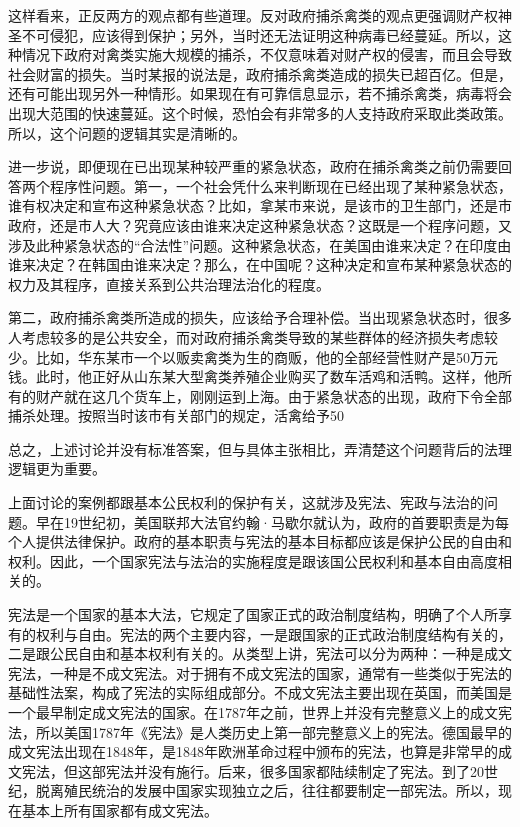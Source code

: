 这样看来，正反两方的观点都有些道理。反对政府捕杀禽类的观点更强调财产权神圣不可侵犯，应该得到保护；另外，当时还无法证明这种病毒已经蔓延。所以，这种情况下政府对禽类实施大规模的捕杀，不仅意味着对财产权的侵害，而且会导致社会财富的损失。当时某报的说法是，政府捕杀禽类造成的损失已超百亿。但是，还有可能出现另外一种情形。如果现在有可靠信息显示，若不捕杀禽类，病毒将会出现大范围的快速蔓延。这个时候，恐怕会有非常多的人支持政府采取此类政策。所以，这个问题的逻辑其实是清晰的。

进一步说，即便现在已出现某种较严重的紧急状态，政府在捕杀禽类之前仍需要回答两个程序性问题。第一，一个社会凭什么来判断现在已经出现了某种紧急状态，谁有权决定和宣布这种紧急状态？比如，拿某市来说，是该市的卫生部门，还是市政府，还是市人大？究竟应该由谁来决定这种紧急状态？这既是一个程序问题，又涉及此种紧急状态的“合法性”问题。这种紧急状态，在美国由谁来决定？在印度由谁来决定？在韩国由谁来决定？那么，在中国呢？这种决定和宣布某种紧急状态的权力及其程序，直接关系到公共治理法治化的程度。

第二，政府捕杀禽类所造成的损失，应该给予合理补偿。当出现紧急状态时，很多人考虑较多的是公共安全，而对政府捕杀禽类导致的某些群体的经济损失考虑较少。比如，华东某市一个以贩卖禽类为生的商贩，他的全部经营性财产是50万元钱。此时，他正好从山东某大型禽类养殖企业购买了数车活鸡和活鸭。这样，他所有的财产就在这几个货车上，刚刚运到上海。由于紧急状态的出现，政府下令全部捕杀处理。按照当时该市有关部门的规定，活禽给予50%

总之，上述讨论并没有标准答案，但与具体主张相比，弄清楚这个问题背后的法理逻辑更为重要。


上面讨论的案例都跟基本公民权利的保护有关，这就涉及宪法、宪政与法治的问题。早在19世纪初，美国联邦大法官约翰·马歇尔就认为，政府的首要职责是为每个人提供法律保护。政府的基本职责与宪法的基本目标都应该是保护公民的自由和权利。因此，一个国家宪法与法治的实施程度是跟该国公民权利和基本自由高度相关的。

宪法是一个国家的基本大法，它规定了国家正式的政治制度结构，明确了个人所享有的权利与自由。宪法的两个主要内容，一是跟国家的正式政治制度结构有关的，二是跟公民自由和基本权利有关的。从类型上讲，宪法可以分为两种：一种是成文宪法，一种是不成文宪法。对于拥有不成文宪法的国家，通常有一些类似于宪法的基础性法案，构成了宪法的实际组成部分。不成文宪法主要出现在英国，而美国是一个最早制定成文宪法的国家。在1787年之前，世界上并没有完整意义上的成文宪法，所以美国1787年《宪法》是人类历史上第一部完整意义上的宪法。德国最早的成文宪法出现在1848年，是1848年欧洲革命过程中颁布的宪法，也算是非常早的成文宪法，但这部宪法并没有施行。后来，很多国家都陆续制定了宪法。到了20世纪，脱离殖民统治的发展中国家实现独立之后，往往都要制定一部宪法。所以，现在基本上所有国家都有成文宪法。

